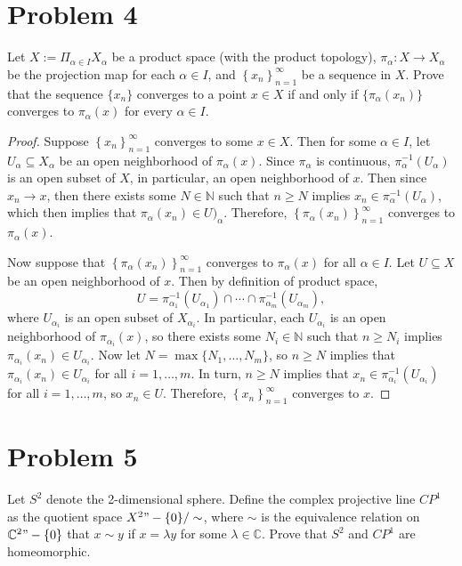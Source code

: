 \documentclass[12pt]{article}
\newenvironment{problem}
    {\begin{lrbox}{\mybox}\begin{minipage}{\textwidth-10pt}}
    {\end{minipage}\end{lrbox}\framebox[6.5in]{\usebox{\mybox}}}
\newcommand{\seq}[2]{\left\{#1\right\}_{#2=1}^\infty}
\newcommand{\N}{\mathbb{N}}
\newcommand{\C}{\mathbb{C}}
\begin{document}
\section*{Problem 4}
\begin{problem}
    Let $X:=\Pi_{\alpha\in I}X_\alpha$ be a product space (with the product topology), $\pi_\alpha:X\to X_\alpha$ be the projection map for each $\alpha\in I$, and $\seq{x_n}{n}$ be a sequence in $X$. Prove that the sequence $\{x_n\}$ converges to a point $x\in X$ if and only if $\{\pi_\alpha(x_n)\}$ converges to $\pi_\alpha(x)$ for every $\alpha\in I$.
\end{problem}

\begin{proof}
    Suppose $\seq{x_n}{n}$ converges to some $x\in X$. Then for some $\alpha\in I$, let $U_\alpha\subseteq X_\alpha$ be an open neighborhood of $\pi_\alpha(x)$. Since $\pi_\alpha$ is continuous, $\pi_\alpha^{-1}(U_\alpha)$ is an open subset of $X$, in particular, an open neighborhood of $x$. Then since $x_n\to x$, then there exists some $N\in\N$ such that $n\geq N$ implies $x_n\in \pi_\alpha^{-1}(U_\alpha)$, which then implies that $\pi_\alpha(x_n)\in U)_\alpha$. Therefore, $\seq{\pi_\alpha(x_n)}{n}$ converges to $\pi_\alpha(x)$.
    
    Now suppose that $\seq{\pi_\alpha(x_n)}{n}$ converges to $\pi_\alpha(x)$ for all $\alpha\in I$. Let $U\subseteq X$ be an open neighborhood of $x$. Then by definition of product space,
    \[U = \pi_{\alpha_1}^{-1}(U_{\alpha_1}) \cap \cdots \cap \pi_{\alpha_m}^{-1}(U_{\alpha_m}),\]
    where $U_{\alpha_i}$ is an open subset of $X_{\alpha_i}$. In particular, each $U_{\alpha_i}$ is an open neighborhood of $\pi_{\alpha_i}(x)$, so there exists some $N_i\in\N$ such that $n\geq N_i$ implies $\pi_{\alpha_i}(x_n)\in U_{\alpha_i}$. Now let $N=\max\{N_1,\dots,N_m\}$, so $n\geq N$ implies that $\pi_{\alpha_i}(x_n)\in U_{\alpha_i}$ for all $i=1,\dots,m$. In turn, $n\geq N$ implies that $x_n\in\pi_{\alpha_i}^{-1}(U_{\alpha_i})$ for all $i=1,\dots,m$, so $x_n\in U$. Therefore, $\seq{x_n}{n}$ converges to $x$.
    
\end{proof}

\section*{Problem 5}
\begin{problem}
    Let $S^2$ denote the 2-dimensional sphere. Define the complex projective line $CP^1$ as the quotient space $X^2"-\{0\}/\sim$, where $\sim$ is the equivalence relation on $\C^2"-\{0\}$ that $x\sim y$ if $x=\lambda y$ for some $\lambda\in\C$. Prove that $S^2$ and $CP^1$ are homeomorphic.
\end{problem}
\end{document}
